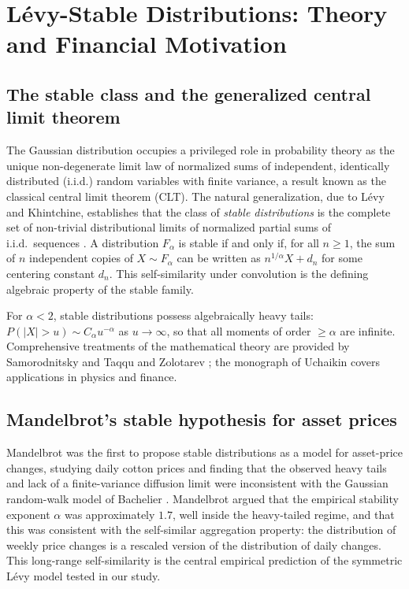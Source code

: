 \documentclass[12pt,a4paper]{article}
\begin{document}
\section{Lévy-Stable Distributions: Theory and Financial Motivation}
\label{sec:stable}

\subsection{The stable class and the generalized central limit theorem}

The Gaussian distribution occupies a privileged role in probability theory as
the unique non-degenerate limit law of normalized sums of independent,
identically distributed (i.i.d.) random variables with finite variance,
a result known as the classical central limit theorem (CLT). The natural generalization, due to
Lévy and Khintchine, establishes that the class of \textit{stable
distributions} is the complete set of non-trivial distributional limits of
normalized partial sums of i.i.d.\ sequences
\cite{SamorodTaqqu1994,GnedenkoKolmogorov1954}. A distribution
$F_\alpha$ is stable if and only if, for all $n \geq 1$, the sum of $n$
independent copies of $X \sim F_\alpha$ can be written as $n^{1/\alpha} X +
d_n$ for some centering constant $d_n$. This self-similarity under
convolution is the defining algebraic property of the stable family.

For $\alpha < 2$, stable distributions possess algebraically heavy tails:
$P(|X| > u) \sim C_\alpha u^{-\alpha}$ as $u \to \infty$, so that all moments
of order $\geq \alpha$ are infinite. Comprehensive treatments of the
mathematical theory are provided by Samorodnitsky and Taqqu \cite{SamorodTaqqu1994} and
Zolotarev \cite{Zolotarev1986}; the monograph of Uchaikin \cite{Uchaikin2003} covers
applications in physics and finance.

\subsection{Mandelbrot's stable hypothesis for asset prices}

Mandelbrot \cite{Mandelbrot1963} was the first to propose stable distributions as a
model for asset-price changes, studying daily cotton prices and finding that
the observed heavy tails and lack of a finite-variance diffusion limit were
inconsistent with the Gaussian random-walk model of Bachelier \cite{Bachelier1900}.
Mandelbrot argued that the empirical stability exponent $\alpha$ was
approximately $1.7$, well inside the heavy-tailed regime, and that this was
consistent with the self-similar aggregation property: the distribution of
weekly price changes is a rescaled version of the distribution of daily
changes. This long-range self-similarity is the central empirical prediction
of the symmetric Lévy model tested in our study.
\end{document}

